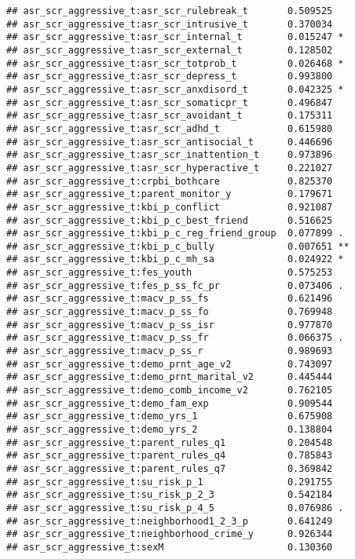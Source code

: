 \documentclass[
]{article}
\begin{document}
\begin{verbatim}
## asr_scr_aggressive_t:asr_scr_rulebreak_t       0.509525    
## asr_scr_aggressive_t:asr_scr_intrusive_t       0.370034    
## asr_scr_aggressive_t:asr_scr_internal_t        0.015247 *  
## asr_scr_aggressive_t:asr_scr_external_t        0.128502    
## asr_scr_aggressive_t:asr_scr_totprob_t         0.026468 *  
## asr_scr_aggressive_t:asr_scr_depress_t         0.993800    
## asr_scr_aggressive_t:asr_scr_anxdisord_t       0.042325 *  
## asr_scr_aggressive_t:asr_scr_somaticpr_t       0.496847    
## asr_scr_aggressive_t:asr_scr_avoidant_t        0.175311    
## asr_scr_aggressive_t:asr_scr_adhd_t            0.615980    
## asr_scr_aggressive_t:asr_scr_antisocial_t      0.446696    
## asr_scr_aggressive_t:asr_scr_inattention_t     0.973896    
## asr_scr_aggressive_t:asr_scr_hyperactive_t     0.221027    
## asr_scr_aggressive_t:crpbi_bothcare            0.825370    
## asr_scr_aggressive_t:parent_monitor_y          0.179671    
## asr_scr_aggressive_t:kbi_p_conflict            0.921087    
## asr_scr_aggressive_t:kbi_p_c_best_friend       0.516625    
## asr_scr_aggressive_t:kbi_p_c_reg_friend_group  0.077899 .  
## asr_scr_aggressive_t:kbi_p_c_bully             0.007651 ** 
## asr_scr_aggressive_t:kbi_p_c_mh_sa             0.024922 *  
## asr_scr_aggressive_t:fes_youth                 0.575253    
## asr_scr_aggressive_t:fes_p_ss_fc_pr            0.073406 .  
## asr_scr_aggressive_t:macv_p_ss_fs              0.621496    
## asr_scr_aggressive_t:macv_p_ss_fo              0.769948    
## asr_scr_aggressive_t:macv_p_ss_isr             0.977870    
## asr_scr_aggressive_t:macv_p_ss_fr              0.066375 .  
## asr_scr_aggressive_t:macv_p_ss_r               0.989693    
## asr_scr_aggressive_t:demo_prnt_age_v2          0.743097    
## asr_scr_aggressive_t:demo_prnt_marital_v2      0.445444    
## asr_scr_aggressive_t:demo_comb_income_v2       0.762105    
## asr_scr_aggressive_t:demo_fam_exp              0.909544    
## asr_scr_aggressive_t:demo_yrs_1                0.675908    
## asr_scr_aggressive_t:demo_yrs_2                0.138804    
## asr_scr_aggressive_t:parent_rules_q1           0.204548    
## asr_scr_aggressive_t:parent_rules_q4           0.785843    
## asr_scr_aggressive_t:parent_rules_q7           0.369842    
## asr_scr_aggressive_t:su_risk_p_1               0.291755    
## asr_scr_aggressive_t:su_risk_p_2_3             0.542184    
## asr_scr_aggressive_t:su_risk_p_4_5             0.076986 .  
## asr_scr_aggressive_t:neighborhood1_2_3_p       0.641249    
## asr_scr_aggressive_t:neighborhood_crime_y      0.926344    
## asr_scr_aggressive_t:sexM                      0.130360    

\end{verbatim}
\end{document}
